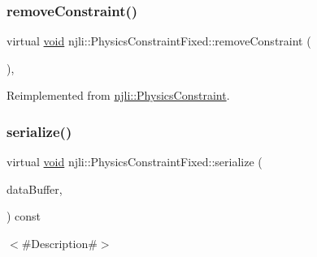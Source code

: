 \mbox{\label{classnjli_1_1_physics_constraint_fixed_a6b0a9ef970808875deef88a91f59f8b7}} 
\subsubsection{\texorpdfstring{remove\+Constraint()}{removeConstraint()}}
{\footnotesize\ttfamily virtual \mbox{\hyperlink{_thread_8h_af1e856da2e658414cb2456cb6f7ebc66}{void}} njli\+::\+Physics\+Constraint\+Fixed\+::remove\+Constraint (\begin{DoxyParamCaption}{ }\end{DoxyParamCaption})\hspace{0.3cm}{\ttfamily [protected]}, {\ttfamily [virtual]}}



Reimplemented from \mbox{\hyperlink{classnjli_1_1_physics_constraint_ae3dc487da3069d859bb4ddb05aa2e779}{njli\+::\+Physics\+Constraint}}.

\mbox{\label{classnjli_1_1_physics_constraint_fixed_a36b23b6b62b01e82724b71bc02e5c887}} 
\subsubsection{\texorpdfstring{serialize()}{serialize()}}
{\footnotesize\ttfamily virtual \mbox{\hyperlink{_thread_8h_af1e856da2e658414cb2456cb6f7ebc66}{void}} njli\+::\+Physics\+Constraint\+Fixed\+::serialize (\begin{DoxyParamCaption}\item[{\mbox{\hyperlink{_thread_8h_af1e856da2e658414cb2456cb6f7ebc66}{void}} $\ast$}]{data\+Buffer,  }\item[{bt\+Serializer $\ast$}]{ }\end{DoxyParamCaption}) const\hspace{0.3cm}{\ttfamily [virtual]}}



$<$\#\+Description\#$>$ 

